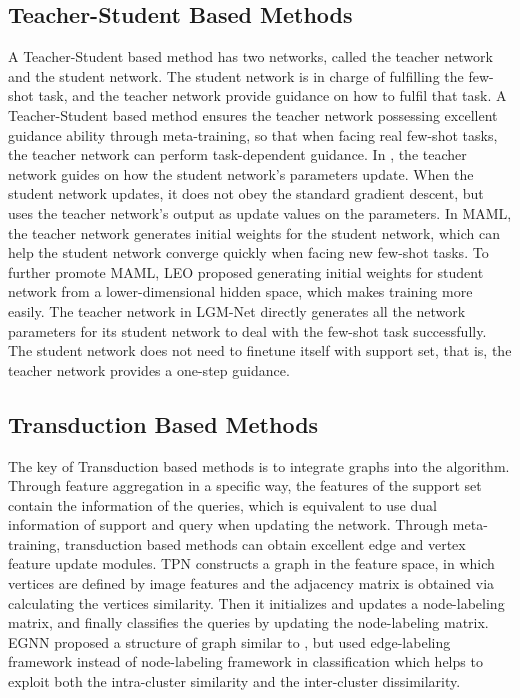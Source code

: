 \documentclass[conference]{IEEEtran}
\begin{document}
\subsection{Teacher-Student Based Methods}
A Teacher-Student based method has two networks, called the teacher network and the student network. The student network is in charge of fulfilling the few-shot task, and the teacher network provide guidance on how to fulfil that task. A Teacher-Student based method ensures the teacher network possessing excellent guidance ability through meta-training, so that when facing real few-shot tasks, the teacher network can perform task-dependent guidance. In \cite{ravi2016optimization}, the teacher network guides on how the student network’s parameters update. When the student network updates, it does not obey the standard gradient descent, but uses the teacher network’s output as update values on the parameters. In MAML\cite{finn2017model}, the teacher network generates initial weights for the student network, which can help the student network converge quickly when facing new few-shot tasks. To further promote MAML, LEO \cite{rusu2018meta} proposed generating initial weights for student network from a lower-dimensional hidden space, which makes training more easily. The teacher network in LGM-Net \cite{li2019lgm} directly generates all the network parameters for its student network to deal with the few-shot task successfully. The student network does not need to finetune itself with support set, that is, the teacher network provides a one-step guidance.

\subsection{Transduction Based Methods}
The key of Transduction based methods is to integrate graphs into the algorithm. Through feature aggregation in a specific way, the features of the support set contain the information of the queries, which is equivalent to use dual information of support and query when updating the network. Through meta-training, transduction based methods can obtain excellent edge and vertex feature update modules. TPN \cite{liu2018learning} constructs a graph in the feature space, in which vertices are defined by image features and the adjacency matrix is obtained via calculating the vertices similarity. Then it initializes and updates a node-labeling matrix, and finally classifies the queries by updating the node-labeling matrix. EGNN \cite{kim2019edge} proposed a structure of graph similar to \cite{liu2018learning}, but used edge-labeling framework instead of node-labeling framework in classification which helps to exploit both the intra-cluster similarity and the inter-cluster dissimilarity.
\end{document}
